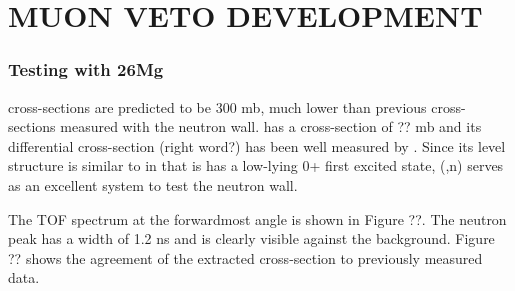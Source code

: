 %
%
%
%
%
%
%
%

%
%

\chapter{MUON VETO DEVELOPMENT}
\label{chap:muVeto}

\subsection{Testing with 26Mg}

\GeTargets cross-sections are predicted to be 300 mb, much lower than previous cross-sections measured with the neutron wall.   has a cross-section of ?? mb and its differential cross-section (right word?) has been well measured by \cite{Bohne_Mg}.  Since its level structure is similar to \GeTargets in that is has a low-lying 0+ first excited state, (,n) serves as an excellent system to test the neutron wall.


The TOF spectrum at the forwardmost angle is shown in Figure ??.  The neutron peak has a width of 1.2 ns and is clearly visible against the background.  Figure ?? shows the agreement of the extracted cross-section to previously measured data.

